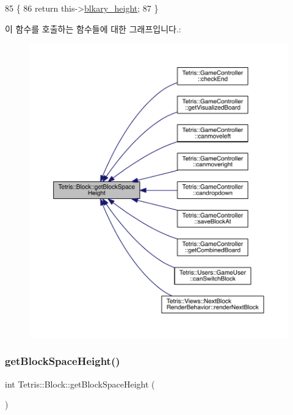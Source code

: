 \begin{DoxyCode}
85                               \{
86                 \textcolor{keywordflow}{return} this->\hyperlink{class_tetris_1_1_block_abbea7737c2b1fb7339aab4dff13de27c}{blkary\_height};
87             \}
\end{DoxyCode}
이 함수를 호출하는 함수들에 대한 그래프입니다.\+:
\nopagebreak
\begin{figure}[H]
\begin{center}
\leavevmode
\includegraphics[width=350pt]{df/d05/class_tetris_1_1_block_a5301977e32c03aaf122fa289fcba77ba_icgraph}
\end{center}
\end{figure}
\mbox{\label{class_tetris_1_1_block_a5301977e32c03aaf122fa289fcba77ba}} 
\subsubsection{\texorpdfstring{get\+Block\+Space\+Height()}{getBlockSpaceHeight()}\hspace{0.1cm}{\footnotesize\ttfamily [2/2]}}
{\footnotesize\ttfamily int Tetris\+::\+Block\+::get\+Block\+Space\+Height (\begin{DoxyParamCaption}{ }\end{DoxyParamCaption})\hspace{0.3cm}{\ttfamily [inline]}}

